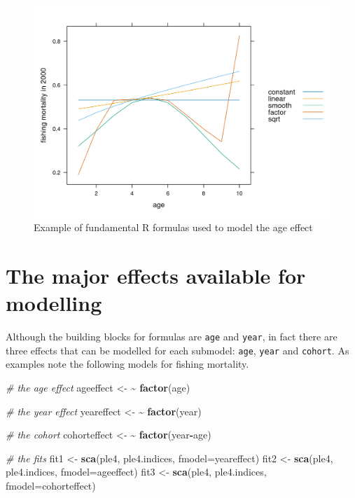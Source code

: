 \documentclass[
]{book}
\newenvironment{Shaded}{\begin{snugshade}}{\end{snugshade}}
\newcommand{\AttributeTok}[1]{\textcolor[rgb]{0.13,0.29,0.53}{#1}}
\newcommand{\CommentTok}[1]{\textcolor[rgb]{0.56,0.35,0.01}{\textit{#1}}}
\newcommand{\ErrorTok}[1]{\textcolor[rgb]{0.64,0.00,0.00}{\textbf{#1}}}
\newcommand{\FunctionTok}[1]{\textcolor[rgb]{0.13,0.29,0.53}{\textbf{#1}}}
\newcommand{\NormalTok}[1]{#1}
\newcommand{\OtherTok}[1]{\textcolor[rgb]{0.56,0.35,0.01}{#1}}
\newcommand{\SpecialCharTok}[1]{\textcolor[rgb]{0.81,0.36,0.00}{\textbf{#1}}}
\begin{document}
\begin{figure}
\centering
\includegraphics{_bookdown_files/_main_files/figure-html/fundformsage-1.png}
\caption{\label{fig:fundformsage}Example of fundamental R formulas used to model the age effect}
\end{figure}

\hypertarget{the-major-effects-available-for-modelling}{%
\section{The major effects available for modelling}\label{the-major-effects-available-for-modelling}}

Although the building blocks for formulas are \texttt{age} and \texttt{year}, in fact there are three effects that can be modelled for each submodel: \texttt{age}, \texttt{year} and \texttt{cohort}. As examples note the following models for fishing mortality.

\begin{Shaded}
\begin{Highlighting}[]
\CommentTok{\# the age effect}
\NormalTok{ageeffect }\OtherTok{\textless{}{-}} \ErrorTok{\textasciitilde{}} \FunctionTok{factor}\NormalTok{(age)}

\CommentTok{\# the year effect}
\NormalTok{yeareffect }\OtherTok{\textless{}{-}} \ErrorTok{\textasciitilde{}} \FunctionTok{factor}\NormalTok{(year)}

\CommentTok{\# the cohort}
\NormalTok{cohorteffect }\OtherTok{\textless{}{-}} \ErrorTok{\textasciitilde{}} \FunctionTok{factor}\NormalTok{(year}\SpecialCharTok{{-}}\NormalTok{age)}

\CommentTok{\# the fits}
\NormalTok{fit1 }\OtherTok{\textless{}{-}} \FunctionTok{sca}\NormalTok{(ple4, ple4.indices, }\AttributeTok{fmodel=}\NormalTok{yeareffect)}
\NormalTok{fit2 }\OtherTok{\textless{}{-}} \FunctionTok{sca}\NormalTok{(ple4, ple4.indices, }\AttributeTok{fmodel=}\NormalTok{ageeffect)}
\NormalTok{fit3 }\OtherTok{\textless{}{-}} \FunctionTok{sca}\NormalTok{(ple4, ple4.indices, }\AttributeTok{fmodel=}\NormalTok{cohorteffect)}
\end{Highlighting}
\end{Shaded}
\end{document}
